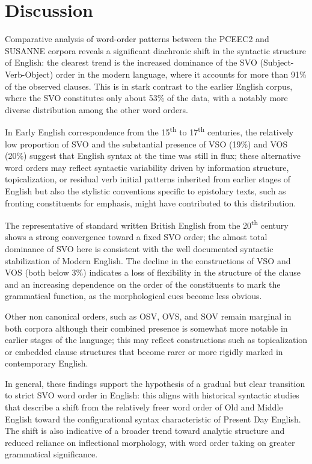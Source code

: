 \documentclass{article}
\begin{document}
\section{Discussion}

Comparative analysis of word-order patterns between the PCEEC2 and SUSANNE corpora reveals a significant diachronic shift in the syntactic structure of English: the clearest trend is the increased dominance of the SVO (Subject-Verb-Object) order in the modern language, where it accounts for more than 91\% of the observed clauses. This is in stark contrast to the earlier English corpus, where the SVO constitutes only about 53\% of the data, with a notably more diverse distribution among the other word orders.

In Early English correspondence from the 15\textsuperscript{th} to 17\textsuperscript{th} centuries, the relatively low proportion of SVO and the substantial presence of VSO (19\%) and VOS (20\%) suggest that English syntax at the time was still in flux; these alternative word orders may reflect syntactic variability driven by information structure, topicalization, or residual verb initial patterns inherited from earlier stages of English but also the stylistic conventions specific to epistolary texts, such as fronting constituents for emphasis, might have contributed to this distribution.

The representative of standard written British English from the 20\textsuperscript{th} century shows a strong convergence toward a fixed SVO order; the almost total dominance of SVO here is consistent with the well documented syntactic stabilization of Modern English. The decline in the constructions of VSO and VOS (both below 3\%) indicates a loss of flexibility in the structure of the clause and an increasing dependence on the order of the constituents to mark the grammatical function, as the morphological cues become less obvious.

Other non canonical orders, such as OSV, OVS, and SOV remain marginal in both corpora although their combined presence is somewhat more notable in earlier stages of the language; this may reflect constructions such as topicalization or embedded clause structures that become rarer or more rigidly marked in contemporary English.

In general, these findings support the hypothesis of a gradual but clear transition to strict SVO word order in English: this aligns with historical syntactic studies \cite{Fischer1988} that describe a shift from the relatively freer word order of Old and Middle English toward the configurational syntax characteristic of Present Day English. The shift is also indicative of a broader trend toward analytic structure and reduced reliance on inflectional morphology, with word order taking on greater grammatical significance.
\end{document}
